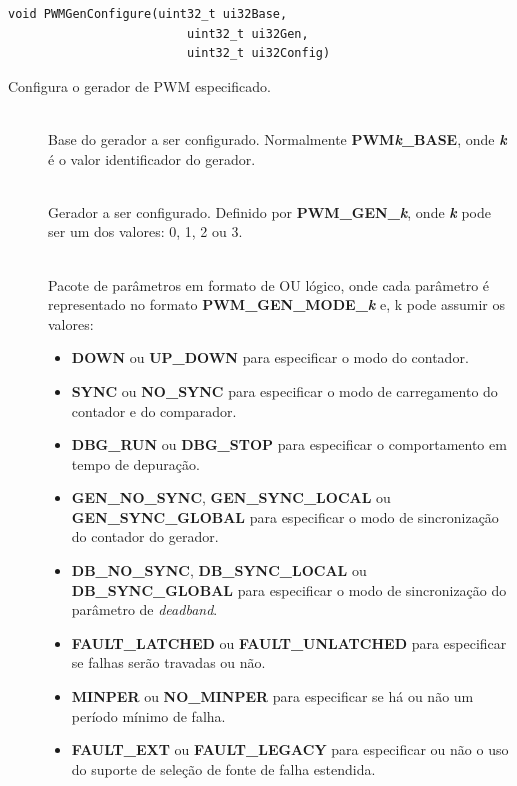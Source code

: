 \begin{lstlisting}[style=funcao]
	void PWMGenConfigure(uint32_t ui32Base,
						 uint32_t ui32Gen,
						 uint32_t ui32Config)
\end{lstlisting}

Configura o gerador de PWM especificado.

\begin{description}
	\item []\hfill \\
	Base do gerador a ser configurado. Normalmente \textbf{PWM\emph{k}\_BASE}, onde \textbf{\emph{k}} é o valor identificador do gerador.
	
	\item []\hfill \\
	Gerador a ser configurado. Definido por \textbf{PWM\_GEN\_\emph{k}}, onde \textbf{\emph{k}} pode ser um dos valores: 0, 1, 2 ou 3.
	
	\item []\hfill \\
	Pacote de parâmetros em formato de OU lógico, onde cada parâmetro é representado no formato \textbf{PWM\_GEN\_MODE\_\emph{k}} e, k pode assumir os valores:
	\begin{itemize}
		\item \textbf{DOWN} ou \textbf{UP\_DOWN} para especificar o modo do contador.
		\item \textbf{SYNC} ou \textbf{NO\_SYNC} para especificar o modo de carregamento do contador e do comparador.
		\item \textbf{DBG\_RUN} ou \textbf{DBG\_STOP} para especificar o comportamento em tempo de depuração.
		\item \textbf{GEN\_NO\_SYNC}, \textbf{GEN\_SYNC\_LOCAL} ou \textbf{GEN\_SYNC\_GLOBAL} para especificar o modo de sincronização do contador do gerador.
		\item \textbf{DB\_NO\_SYNC}, \textbf{DB\_SYNC\_LOCAL} ou \textbf{DB\_SYNC\_GLOBAL} para especificar o modo de sincronização do parâmetro de \emph{deadband}.
		\item \textbf{FAULT\_LATCHED} ou \textbf{FAULT\_UNLATCHED} para especificar se falhas serão travadas ou não.
		\item \textbf{MINPER} ou \textbf{NO\_MINPER} para especificar se há ou não um período mínimo de falha.
		\item \textbf{FAULT\_EXT} ou \textbf{FAULT\_LEGACY} para especificar ou não o uso do suporte de seleção de fonte de falha estendida.
	\end{itemize}
	
\end{description}

